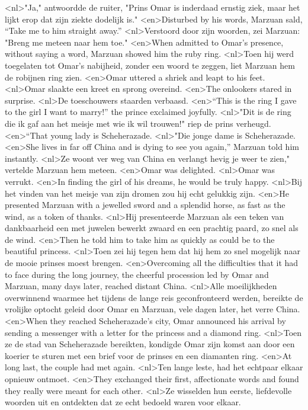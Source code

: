 <nl>"Ja," antwoordde de ruiter, "Prins Omar is inderdaad ernstig ziek, maar het lijkt erop dat zijn ziekte dodelijk is."
<en>Disturbed by his words, Marzuan sald, “Take me to him straight away.” 
<nl>Verstoord door zijn woorden, zei Marzuan: "Breng me meteen naar hem toe." 
<en>When admitted to Omar’s presence, without saying a word, Marzuan showed him the ruby ring.
<nl>Toen hij werd toegelaten tot Omar's nabijheid, zonder een woord te zeggen, liet Marzuan hem de robijnen ring zien.
<en>Omar uttered a shriek and leapt to his feet.
<nl>Omar slaakte een kreet en sprong overeind.
<en>The onlookers stared in surprise.
<nl>De toeschouwers staarden verbaasd.
<en>“This is the ring I gave to the girl I want to marry!” the prince exclaimed joyfully.
<nl>"Dit is de ring die ik gaf aan het meisje met wie ik wil trouwen!" riep de prins verheugd.
<en>“That young lady is Scheherazade.
<nl>"Die jonge dame is Scheherazade.
<en>She lives in far off China and is dying to see you again,” Marzuan told him instantly.
<nl>Ze woont ver weg van China en verlangt hevig je weer te zien," vertelde Marzuan hem meteen.
<en>Omar was delighted.
<nl>Omar was verrukt.
<en>In finding the girl of his dreams, he would be truly happy.
<nl>Bij het vinden van het meisje van zijn dromen zou hij echt gelukkig zijn.
<en>He presented Marzuan with a jewelled sword and a splendid horse, as fast as the wind, as a token of thanks.
<nl>Hij presenteerde Marzuan als een teken van dankbaarheid een met juwelen bewerkt zwaard en een prachtig paard, zo snel als de wind.
<en>Then he told him to take him as quickly as could be to the beautiful princess.
<nl>Toen zei hij tegen hem dat hij hem zo snel mogelijk naar de mooie prinses moest brengen.
<en>Overcoming all the difficulties that it had to face during the long journey, the cheerful procession led by Omar and Marzuan, many days later, reached distant China.
<nl>Alle moeilijkheden overwinnend waarmee het tijdens de lange reis geconfronteerd werden, bereikte de vrolijke optocht geleid door Omar en Marzuan, vele dagen later, het verre China.
<en>When they reached Scheherazade's city, Omar announced his arrival by sending a messenger with a letter for the princess and a diamond ring.
<nl>Toen ze de stad van Scheherazade bereikten, kondigde Omar zijn komst aan door een koerier te sturen met een brief voor de prinses en een diamanten ring.
<en>At long last, the couple had met again.
<nl>Ten lange leste, had het echtpaar elkaar opnieuw ontmoet.
<en>They exchanged their first, affectionate words and found they really were meant for each other.
<nl>Ze wisselden hun eerste, liefdevolle woorden uit en ontdekten dat ze echt bedoeld waren  voor elkaar.
